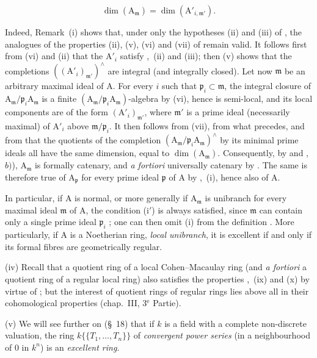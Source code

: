 \begin{remarks}[7.8.4]
\begin{env}[7.8.4.1]
\label{IV.7.8.4.1}
\[
  \dim(\mathrm{A}_\mathfrak{m})=\dim(\mathrm{A}'_{i,\mathfrak{m}'}).
\]
\end{env}

Indeed, Remark~(i) shows that, under only the hypotheses (ii) and (iii) of , the analogues of the properties (ii), (v), (vi) and (vii) of  remain valid. It follows first from (vi) and (ii) that the $\mathrm{A}'_i$ satisfy ,~(ii) and (iii); then (v) shows that the completions $((\mathrm{A}'_i)_{\mathfrak{m}'})^\wedge$ are integral (and integrally closed). Let now $\mathfrak{m}$ be an arbitrary maximal ideal of $\mathrm{A}$. For every $i$ such that $\mathfrak{p}_i\subset\mathfrak{m}$, the integral closure of $\mathrm{A}_\mathfrak{m}/\mathfrak{p}_i\mathrm{A}_\mathfrak{m}$ is a finite $(\mathrm{A}_\mathfrak{m}/\mathfrak{p}_i\mathrm{A}_\mathfrak{m})$-algebra by (vi), hence is semi-local, and its local components are of the form $(\mathrm{A}'_i)_{\mathfrak{m}'}$, where $\mathfrak{m}'$ is a prime ideal (necessarily maximal) of $\mathrm{A}'_i$ above $\mathfrak{m}/\mathfrak{p}_i$. It then follows from (vii), from what precedes, and from  that the quotients of the completion $(\mathrm{A}_\mathfrak{m}/\mathfrak{p}_i\mathrm{A}_\mathfrak{m})^\wedge$ by its minimal prime ideals all have the same dimension, equal to $\dim(\mathrm{A}_\mathfrak{m})$. Consequently, by  and ,~$b)$), $\mathrm{A}_\mathfrak{m}$ is formally catenary, and \emph{a fortiori} universally catenary by . The same is therefore true of $\mathrm{A}_\mathfrak{p}$ for every prime ideal $\mathfrak{p}$ of $\mathrm{A}$ by ,~(i), hence also of $\mathrm{A}$.

In particular, if $\mathrm{A}$ is normal, or more generally if $\mathrm{A}_\mathfrak{m}$ is unibranch for every maximal ideal $\mathfrak{m}$ of $\mathrm{A}$, the condition (i$'$) is always satisfied, since $\mathfrak{m}$ can contain only a single prime ideal $\mathfrak{p}_i$ ; one can then omit (i) from the definition . More particularly, if $\mathrm{A}$ is a Noetherian ring, \emph{local unibranch}, it is excellent if and only if its formal fibres are geometrically regular.

(iv) Recall that a quotient ring of a local Cohen--Macaulay ring (and \emph{a fortiori} a quotient ring of a regular local ring) also satisfies the properties ,~(ix) and (x) by virtue of ; but the interest of quotient rings of regular rings lies above all in their cohomological properties (chap.~III, 3${}^{\text{e}}$ Partie).

(v) We will see further on (\S~18) that if $k$ is a field with a complete non-discrete valuation, the ring $k\{\!\{T_1,\ldots,T_n\}\!\}$ of \emph{convergent power series} (in a neighbourhood of $0$ in $k^n$) is an \emph{excellent ring}.
\end{remarks}

